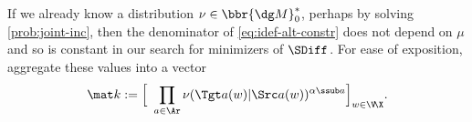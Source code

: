 If we already know a distribution $\nu \in \bbr{\dg M}_0^*$,
perhaps by solving \eqref{prob:joint-inc}, then
the denominator of \eqref{eq:idef-alt-constr} does not depend on $\mu$ 
and so is constant in our search for minimizers of
$\SDiff_{}$.
For ease of exposition, aggregate these values into a vector
\begin{equation}
    \mat k :=
        \Big[
        ~\prod_{a \in \Ar} \nu(\Tgt a (w) | \Src a (w))^{\alpha\ssub a}
        \Big]%
        _{w \in \V\!\X}.
        \label{eq:cm-product}
\end{equation}
%
